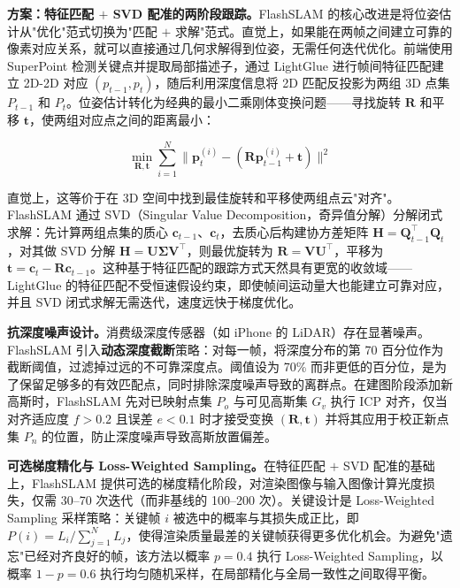 \textbf{方案：特征匹配 $+$ SVD 配准的两阶段跟踪。}FlashSLAM 的核心改进是将位姿估计从"优化"范式切换为"匹配 $+$ 求解"范式。直觉上，如果能在两帧之间建立可靠的像素对应关系，就可以直接通过几何求解得到位姿，无需任何迭代优化。前端使用 SuperPoint 检测关键点并提取局部描述子，通过 LightGlue 进行帧间特征匹配建立 2D-2D 对应 $(p_{t-1}, p_t)$，随后利用深度信息将 2D 匹配反投影为两组 3D 点集 $P_{t-1}$ 和 $P_t$。位姿估计转化为经典的最小二乘刚体变换问题——寻找旋转 $\mathbf{R}$ 和平移 $\mathbf{t}$，使两组对应点之间的距离最小：

\begin{equation}
    \min_{\mathbf{R}, \mathbf{t}} \sum_{i=1}^{N} \| \mathbf{p}_t^{(i)} - (\mathbf{R} \mathbf{p}_{t-1}^{(i)} + \mathbf{t}) \|^2
\end{equation}

直觉上，这等价于在 3D 空间中找到最佳旋转和平移使两组点云"对齐"。FlashSLAM 通过 SVD（Singular Value Decomposition，奇异值分解）分解闭式求解：先计算两组点集的质心 $\mathbf{c}_{t-1}$、$\mathbf{c}_t$，去质心后构建协方差矩阵 $\mathbf{H} = \mathbf{Q}_{t-1}^\top \mathbf{Q}_t$，对其做 SVD 分解 $\mathbf{H} = \mathbf{U}\boldsymbol{\Sigma}\mathbf{V}^\top$，则最优旋转为 $\mathbf{R} = \mathbf{V}\mathbf{U}^\top$，平移为 $\mathbf{t} = \mathbf{c}_t - \mathbf{R}\mathbf{c}_{t-1}$。这种基于特征匹配的跟踪方式天然具有更宽的收敛域——LightGlue 的特征匹配不受恒速假设约束，即使帧间运动量大也能建立可靠对应，并且 SVD 闭式求解无需迭代，速度远快于梯度优化。

\textbf{抗深度噪声设计。}消费级深度传感器（如 iPhone 的 LiDAR）存在显著噪声。FlashSLAM 引入\textbf{动态深度截断}策略：对每一帧，将深度分布的第 70 百分位作为截断阈值，过滤掉过远的不可靠深度点。阈值设为 70\% 而非更低的百分位，是为了保留足够多的有效匹配点，同时排除深度噪声导致的离群点。在建图阶段添加新高斯时，FlashSLAM 先对已映射点集 $P_o$ 与可见高斯集 $G_v$ 执行 ICP 对齐，仅当对齐适应度 $f > 0.2$ 且误差 $e < 0.1$ 时才接受变换 $(\mathbf{R}, \mathbf{t})$ 并将其应用于校正新点集 $P_n$ 的位置，防止深度噪声导致高斯放置偏差。

\textbf{可选梯度精化与 Loss-Weighted Sampling。}在特征匹配 $+$ SVD 配准的基础上，FlashSLAM 提供可选的梯度精化阶段，对渲染图像与输入图像计算光度损失，仅需 30--70 次迭代（而非基线的 100--200 次）。关键设计是 Loss-Weighted Sampling 采样策略：关键帧 $i$ 被选中的概率与其损失成正比，即 $P(i) = L_i / \sum_{j=1}^{N} L_j$，使得渲染质量最差的关键帧获得更多优化机会。为避免"遗忘"已经对齐良好的帧，该方法以概率 $p = 0.4$ 执行 Loss-Weighted Sampling，以概率 $1-p = 0.6$ 执行均匀随机采样，在局部精化与全局一致性之间取得平衡。

